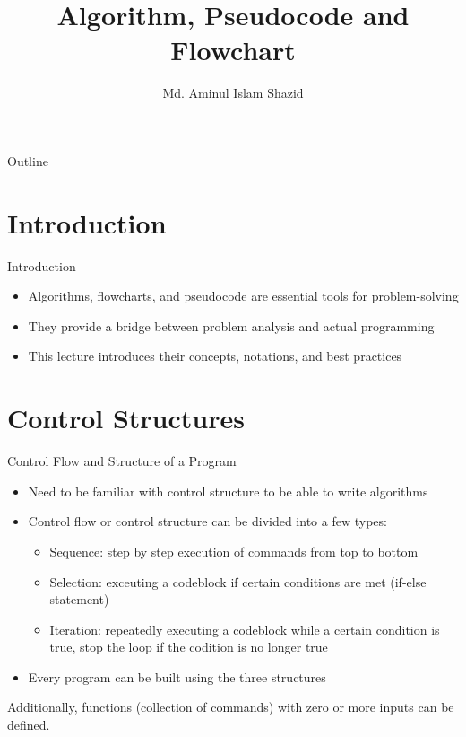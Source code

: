 \documentclass[12pt, aspectratio=169]{beamer}
\title{Algorithm, Pseudocode and Flowchart}
\author{Md. Aminul Islam Shazid}
\date{}
\begin{document}
    {
		\addtocounter{framenumber}{-2}    %

		\begin{frame}
			\titlepage
		\end{frame}

		\begin{frame}{Outline}
            \vfill
			\tableofcontents[subsectionstyle=hide]
            \vfill
		\end{frame}
	}


    \section{Introduction}
    \begin{frame}{Introduction}
        \begin{itemize}
            \item Algorithms, flowcharts, and pseudocode are essential tools for problem-solving
            \item They provide a bridge between problem analysis and actual programming
            \item This lecture introduces their concepts, notations, and best practices
        \end{itemize}
    \end{frame}


    \section{Control Structures}

    \begin{frame}{Control Flow and Structure of a Program}
        \begin{itemize}
            \item Need to be familiar with control structure to be able to write algorithms
            \item Control flow or control structure can be divided into a few types:
            \begin{itemize}
                \item Sequence: step by step execution of commands from top to bottom
                \item Selection: exceuting a codeblock if certain conditions are met (if-else statement)
                \item Iteration: repeatedly executing a codeblock while a certain condition is true, stop the loop if the codition is no longer true
            \end{itemize}
            \item Every program can be built using the three structures
        \end{itemize}

        \vspace{1em}

        Additionally, functions (collection of commands) with zero or more inputs can be defined.
    \end{frame}
\end{document}
